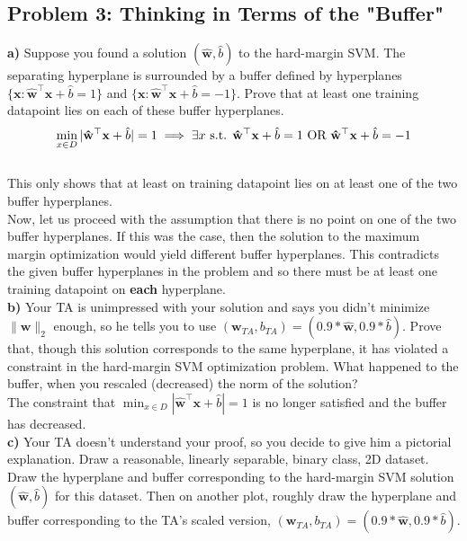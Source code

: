 \documentclass[a4paper]{article}
\begin{document}
\subsection*{Problem 3: Thinking in Terms of the "Buffer"}
\textbf{a)} Suppose you found a solution $(\mathbf{\hat w},\hat b)$ to the hard-margin SVM. The separating hyperplane is surrounded by a buffer defined by hyperplanes $\{\mathbf{x}: \mathbf{\hat w}^\top\mathbf{x}+\hat b=1\}$ and $\{\mathbf{x}: \mathbf{\hat w}^\top\mathbf{x}+\hat b=-1\}$. Prove that at least one training datapoint lies on each of these buffer hyperplanes.\\

\[
\min_{x \in D} |\mathbf{\hat w}^\top\mathbf{x} + \hat b| = 1 \\
\implies \exists x \text{ s.t. } \mathbf{\hat w}^\top\mathbf{x} + \hat b = 1 \text{ OR } \mathbf{\hat w}^\top\mathbf{x} + \hat b = -1
\] \\

This only shows that at least on training datapoint lies on at least one of the two buffer hyperplanes. \\

Now, let us proceed with the assumption that there is no point on one of the two buffer hyperplanes. If this was the case, then the solution to the maximum margin optimization would yield different buffer hyperplanes. This contradicts the given buffer hyperplanes in the problem and so there must be at least one training datapoint on \textbf{each} hyperplane. \\

\textbf{b)} Your TA is unimpressed with your solution and says you didn't minimize $\|\mathbf{w}\|_2$ enough, so he tells you to use $(\mathbf{w}_{TA},b_{TA})=(0.9*\mathbf{\hat w},0.9*\hat b)$. Prove that, though this solution corresponds to the same hyperplane, it has violated a constraint in the hard-margin SVM optimization problem. What happened to the buffer, when you rescaled (decreased) the norm of the solution?\\

The constraint that $\min_{x \in D} |\mathbf{\hat w}^\top\mathbf{x} + \hat b| = 1$ is no longer satisfied and the buffer has decreased. \\

\textbf{c)} Your TA doesn't understand your proof, so you decide to give him a pictorial explanation. Draw a reasonable, linearly separable, binary class, 2D dataset. Draw the hyperplane and buffer corresponding to the hard-margin SVM solution $(\mathbf{\hat w},\hat b)$ for this dataset. Then on another plot, roughly draw the hyperplane and buffer corresponding to the TA's scaled version, $(\mathbf{w}_{TA},b_{TA})=(0.9*\mathbf{\hat w},0.9*\hat b)$.\\
\end{document}
